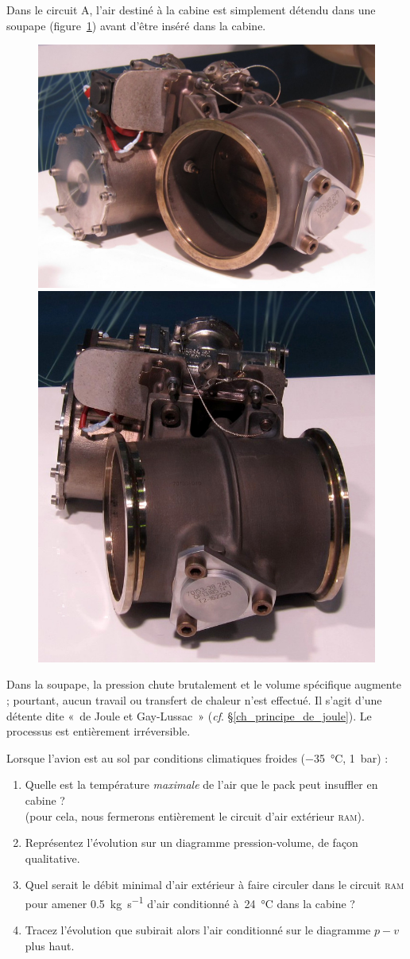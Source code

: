 	Dans le circuit A, l’air destiné à la cabine est simplement détendu dans une soupape (figure~\ref{fig_soupape}) avant d’être inséré dans la cabine.

	\begin{figure}
		\begin{center}
			\includegraphics[height=.2\textwidth]{images/outflow_valve_1.jpg}
			\includegraphics[height=.2\textwidth]{images/outflow_valve_2.jpg}
		\end{center}
		\label{fig_soupape}
	\end{figure}
	
	Dans la soupape, la pression chute brutalement et le volume spécifique augmente ; pourtant, aucun travail ou transfert de chaleur n’est effectué. Il s’agit d’une détente dite «~de Joule et Gay-Lussac~» (\textit{cf}. \S\ref{ch_principe_de_joule}). Le processus est entièrement irréversible.
	
	Lorsque l’avion est au sol par conditions climatiques froides (\SI{-35}{\degreeCelsius}, \SI{1}{\bar}) :
	
	\begin{enumerate}
		\item Quelle est la température \emph{maximale} de l’air que le pack peut insuffler en cabine ?\\
			(pour cela, nous fermerons entièrement le circuit d’air extérieur \textsc{ram}).
		\item Représentez l’évolution sur un diagramme pression-volume, de façon qualitative.
		\item Quel serait le débit minimal d’air extérieur à faire circuler dans le circuit \textsc{ram} pour amener \SI[per-mode=symbol]{0,5}{\kilogram\per\second} d’air conditionné à~\SI{24}{\degreeCelsius} dans la cabine ?
		\item Tracez l’évolution que subirait alors l’air conditionné sur le diagramme $p-v$ plus haut.
	\end{enumerate}


